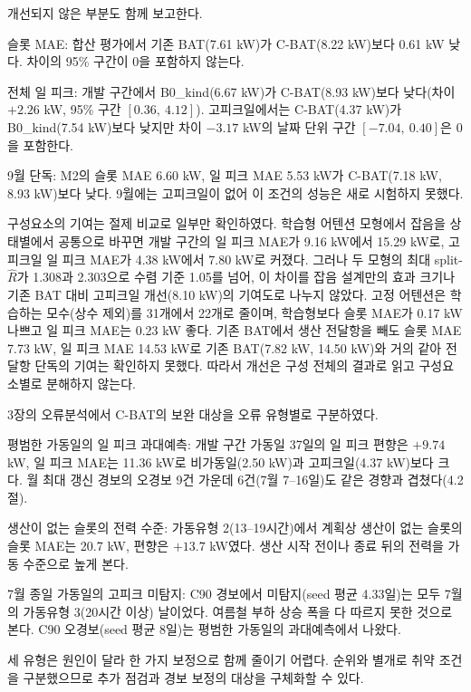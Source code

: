 개선되지 않은 부분도 함께 보고한다.
\begin{hwplist}
\item 슬롯 MAE: 합산 평가에서 기존 BAT(7.61 kW)가 C-BAT(8.22 kW)보다 0.61 kW 낮다. 차이의 95\% 구간이 0을 포함하지 않는다.
\item 전체 일 피크: 개발 구간에서 B0\_kind(6.67 kW)가 C-BAT(8.93 kW)보다 낮다(차이 $+2.26$ kW, 95\% 구간 $[0.36,\ 4.12]$). 고피크일에서는 C-BAT(4.37 kW)가 B0\_kind(7.54 kW)보다 낮지만 차이 $-3.17$ kW의 날짜 단위 구간 $[-7.04,\ 0.40]$은 0을 포함한다.
\item 9월 단독: M2의 슬롯 MAE 6.60 kW, 일 피크 MAE 5.53 kW가 C-BAT(7.18 kW, 8.93 kW)보다 낮다. 9월에는 고피크일이 없어 이 조건의 성능은 새로 시험하지 못했다.
\end{hwplist}

구성요소의 기여는 절제 비교로 일부만 확인하였다. 학습형 어텐션 모형에서 잡음을 상태별에서 공통으로 바꾸면 개발 구간의 일 피크 MAE가 9.16 kW에서 15.29 kW로, 고피크일 일 피크 MAE가 4.38 kW에서 7.80 kW로 커졌다. 그러나 두 모형의 최대 split-$\hat R$가 1.308과 2.303으로 수렴 기준 1.05를 넘어, 이 차이를 잡음 설계만의 효과 크기나 기존 BAT 대비 고피크일 개선(8.10 kW)의 기여도로 나누지 않았다. 고정 어텐션은 학습하는 모수(상수 제외)를 31개에서 22개로 줄이며, 학습형보다 슬롯 MAE가 0.17 kW 나쁘고 일 피크 MAE는 0.23 kW 좋다. 기존 BAT에서 생산 전달항을 빼도 슬롯 MAE 7.73 kW, 일 피크 MAE 14.53 kW로 기존 BAT(7.82 kW, 14.50 kW)와 거의 같아 전달항 단독의 기여는 확인하지 못했다. 따라서 개선은 구성 전체의 결과로 읽고 구성요소별로 분해하지 않는다.


3장의 오류분석에서 C-BAT의 보완 대상을 오류 유형별로 구분하였다.
\begin{hwplist}
\item 평범한 가동일의 일 피크 과대예측: 개발 구간 가동일 37일의 일 피크 편향은 $+9.74$ kW, 일 피크 MAE는 11.36 kW로 비가동일(2.50 kW)과 고피크일(4.37 kW)보다 크다. 월 최대 갱신 경보의 오경보 9건 가운데 6건(7월 7--16일)도 같은 경향과 겹쳤다(4.2절).
\item 생산이 없는 슬롯의 전력 수준: 가동유형 2(13--19시간)에서 계획상 생산이 없는 슬롯의 슬롯 MAE는 20.7 kW, 편향은 $+13.7$ kW였다. 생산 시작 전이나 종료 뒤의 전력을 가동 수준으로 높게 본다.
\item 7월 종일 가동일의 고피크 미탐지: C90 경보에서 미탐지(seed 평균 4.33일)는 모두 7월의 가동유형 3(20시간 이상) 날이었다. 여름철 부하 상승 폭을 다 따르지 못한 것으로 본다. C90 오경보(seed 평균 8일)는 평범한 가동일의 과대예측에서 나왔다.
\end{hwplist}
세 유형은 원인이 달라 한 가지 보정으로 함께 줄이기 어렵다. 순위와 별개로 취약 조건을 구분했으므로 추가 점검과 경보 보정의 대상을 구체화할 수 있다.

